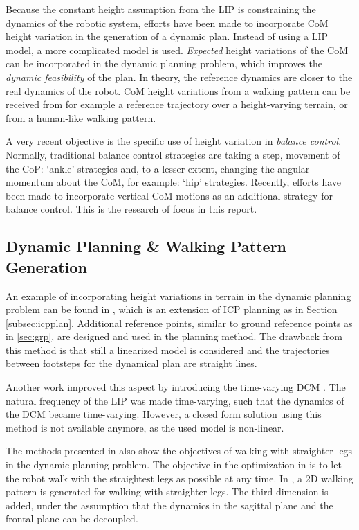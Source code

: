 Because the constant height assumption from the \ac{LIP} is constraining the dynamics of the robotic system, efforts have been made to incorporate CoM height variation in the generation of a dynamic plan. Instead of using a LIP model, a more complicated model is used. \textit{Expected} height variations of the CoM can be incorporated in the dynamic planning problem, which improves the \textit{dynamic feasibility} of the plan. In theory, the reference dynamics are closer to the real dynamics of the robot. \ac{CoM} height variations from a walking pattern can be received from for example a reference trajectory over a height-varying terrain, or from a human-like walking pattern. 

A very recent objective is the specific use of height variation in \textit{balance control}. Normally, traditional balance control strategies are taking a step, movement of the \ac{CoP}: `ankle' strategies and, to a lesser extent, changing the angular momentum about the \ac{CoM}, for example: `hip' strategies. Recently, efforts have been made to incorporate vertical \ac{CoM} motions as an additional strategy for balance control. This is the research of focus in this report.

\subsection{Dynamic Planning \& Walking Pattern Generation}
An example of incorporating height variations in terrain in the dynamic planning problem can be found in \cite{englsberger2013three}, which is an extension of \ac{ICP} planning as in Section \ref{subsec:icpplan}. Additional reference points, similar to ground reference points as in \ref{sec:grp}, are designed and used in the planning method. The drawback from this method is that still a linearized model is considered and the trajectories between footsteps for the dynamical plan are straight lines. 

Another work improved this aspect by introducing the time-varying \ac{DCM} \cite{hopkins2014humanoid}. The natural frequency of the \ac{LIP} was made time-varying, such that the dynamics of the \ac{DCM} became time-varying. However, a closed form solution using this method is not available anymore, as the used model is non-linear.

The methods presented in \cite{brasseur2015robust} \cite{kajita2017biped} also show the objectives of walking with straighter legs in the dynamic planning problem. The objective in the optimization in \cite{brasseur2015robust} is to let the robot walk with the straightest legs as possible at any time. In \cite{kajita2017biped}, a \ac{2D} walking pattern is generated for walking with straighter legs. The third dimension is added, under the assumption that the dynamics in the sagittal plane and the frontal plane can be decoupled. 
